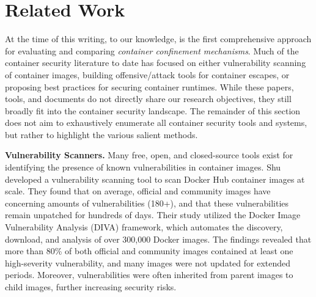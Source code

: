 \section{Related Work}%
\label{sec:related}

At the time of this writing, to our knowledge, \houdini is the first comprehensive approach for evaluating and comparing \textit{container confinement mechanisms}. Much of the container security literature to date has focused on either vulnerability scanning of container images, building offensive/attack tools for container escapes, or proposing best practices for securing container runtimes. While these papers, tools, and documents do not directly share our research objectives, they still broadly fit into the container security landscape. The remainder of this section does not aim to exhaustively enumerate all container security tools and systems, but rather to highlight the various salient methods.

\noindent\textbf{Vulnerability Scanners.} Many free, open, and closed-source tools exist for identifying the presence of known vulnerabilities in container images. Shu \etal~\cite{shu2017study} developed a vulnerability scanning tool to scan Docker Hub container images at scale. They found that on average, official and community images have concerning amounts of vulnerabilities (180+), and that these vulnerabilities remain unpatched for hundreds of days. Their study utilized the Docker Image Vulnerability Analysis (DIVA) framework, which automates the discovery, download, and analysis of over 300,000 Docker images. The findings revealed that more than 80\% of both official and community images contained at least one high-severity vulnerability, and many images were not updated for extended periods. Moreover, vulnerabilities were often inherited from parent images to child images, further increasing security risks.

